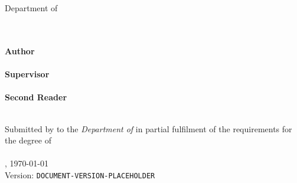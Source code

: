 \begin{titlepage}
    \begin{center}
        {\Large%
           \textsc{\university{}}%
        }
        \\\medskip
        {%
            \textbf{%
                \universityFaculty{}
            }\\
            Department of \universityDepartment{}%
        }
        \\\vfill
        {\Large%
            \textbf{\shortTitle{}}%
        }
		\\\bigskip
        {\Huge%
            \sffamily{%
                \textbf\documentTitle{}%
            }\par%
        }
        \medskip
        {\large%
            \textsl{%
                \documentSubtitle{}%
            }
			\\\vfill
			\textbf{Author}\\
			\documentAuthor{}\\
			\bigskip
			\textbf{Supervisor}\\
			\researchAdvisor{}\\
            \medskip
            \textbf{Second Reader}\\
            \secondReader{}\\
        }
    \end{center}
	\newpage
	\pagestyle{empty}\vspace*{\fill}%
	\noindent%
	Submitted by \textbf{\documentAuthor{}} to the \textsl{Department of \universityDepartment{}} in partial fulfilment of the requirements for the degree of\\
	\textbf{\academicDegree{}}\\
	\medskip{}
	\documentPlace{}, \germanDate{}\today{}\\
	Version: \texttt{DOCUMENT-VERSION-PLACEHOLDER}\\
\end{titlepage}
